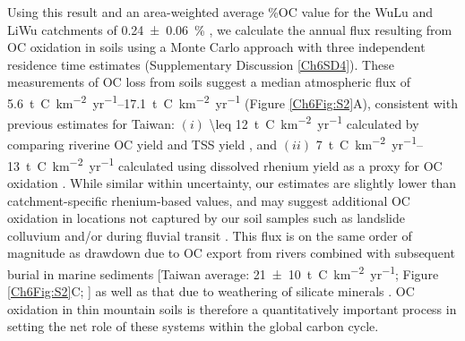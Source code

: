 Using this result and an area-weighted average \%OC value for the WuLu and LiWu catchments of \SI{0.24 \pm 0.06}{\%} \citep{Hilton:2010cg}, we calculate the annual  flux resulting from OC oxidation in soils using a Monte Carlo approach with three independent residence time estimates (Supplementary Discussion \ref{Ch6SD4}). These measurements of OC loss from soils suggest a median atmospheric  flux of \SIrange{5.6}{17.1}{t.C.km^{-2}.yr^{-1}} (Figure \ref{Ch6Fig:S2}A), consistent with previous estimates for Taiwan: $(i)$ \SI{\leq 12}{t.C.km^{-2}.yr^{-1}} calculated by comparing riverine OC yield and TSS yield \citep[Figure \ref{Ch6Fig:S2}B;][]{Hilton:2011jw}, and $(ii)$ \SIrange{7}{13}{t.C.km^{-2}.yr^{-1}} calculated using dissolved rhenium yield as a proxy for OC oxidation \citep[Figure \ref{Ch6Fig:S2}B;][]{Hilton:2014dh}. While similar within uncertainty, our estimates are slightly lower than catchment-specific rhenium-based values, and may suggest additional OC oxidation in locations not captured by our soil samples such as landslide colluvium \citep{Emberson:2016fp} and/or during fluvial transit \citep{Galy:2008ff}. This flux is on the same order of magnitude as  drawdown due to OC export from rivers combined with subsequent burial in marine sediments [Taiwan average: \SI{21 \pm 10}{t.C.km^{-2}.yr^{-1}}; Figure \ref{Ch6Fig:S2}C; \citealp{Hilton:2012dt}] as well as that due to weathering of silicate minerals \citep[LiWu River: \SI{7.04}{t.C.km^{-2}.yr^{-1}}; Figure \ref{Ch6Fig:S2}D;][]{Calmels:2011gv}. OC oxidation in thin mountain soils is therefore a quantitatively important process in setting the net role of these systems within the global carbon cycle.

